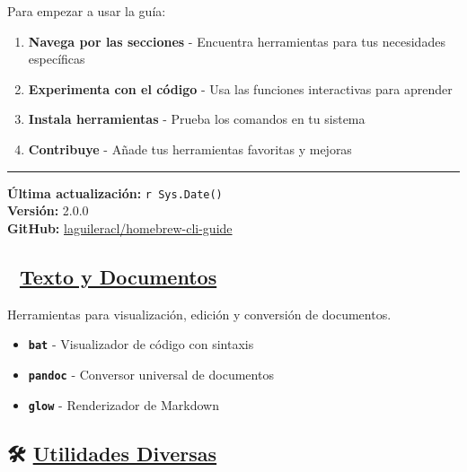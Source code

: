\documentclass[
  11pt,
  letterpaper,
  oneside,
  openany]{scrbook}
\providecommand{\tightlist}{%
  \setlength{\itemsep}{0pt}\setlength{\parskip}{0pt}}
\begin{document}

Para empezar a usar la guía:

\begin{enumerate}
\def\labelenumi{\arabic{enumi}.}
\tightlist
\item
  \textbf{Navega por las secciones} - Encuentra herramientas para tus
  necesidades específicas\\
\item
  \textbf{Experimenta con el código} - Usa las funciones interactivas
  para aprender
\item
  \textbf{Instala herramientas} - Prueba los comandos en tu sistema
\item
  \textbf{Contribuye} - Añade tus herramientas favoritas y mejoras
\end{enumerate}

\begin{center}\rule{0.5\linewidth}{0.5pt}\end{center}

\textbf{Última actualización:} \texttt{r\ Sys.Date()}\\
\textbf{Versión:} 2.0.0\\
\textbf{GitHub:}
\href{https://github.com/laguileracl/homebrew-cli-guide}{laguileracl/homebrew-cli-guide}

\subsection*{\texorpdfstring{📝 \href{texto.qmd}{Texto y
Documentos}}{📝 Texto y Documentos}}\label{texto-y-documentos-1}

Herramientas para visualización, edición y conversión de documentos.

\begin{itemize}
\tightlist
\item
  \textbf{\texttt{bat}} - Visualizador de código con sintaxis
\item
  \textbf{\texttt{pandoc}} - Conversor universal de documentos
\item
  \textbf{\texttt{glow}} - Renderizador de Markdown
\end{itemize}

\subsection*{\texorpdfstring{🛠️ \href{utilidades.qmd}{Utilidades
Diversas}}{🛠️ Utilidades Diversas}}\label{utilidades-diversas-1}
\end{document}
